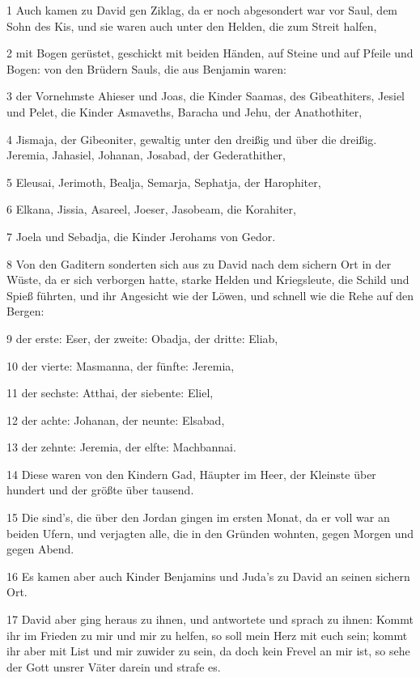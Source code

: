 \par 1 Auch kamen zu David gen Ziklag, da er noch abgesondert war vor Saul, dem Sohn des Kis, und sie waren auch unter den Helden, die zum Streit halfen,
\par 2 mit Bogen gerüstet, geschickt mit beiden Händen, auf Steine und auf Pfeile und Bogen: von den Brüdern Sauls, die aus Benjamin waren:
\par 3 der Vornehmste Ahieser und Joas, die Kinder Saamas, des Gibeathiters, Jesiel und Pelet, die Kinder Asmaveths, Baracha und Jehu, der Anathothiter,
\par 4 Jismaja, der Gibeoniter, gewaltig unter den dreißig und über die dreißig. Jeremia, Jahasiel, Johanan, Josabad, der Gederathither,
\par 5 Eleusai, Jerimoth, Bealja, Semarja, Sephatja, der Harophiter,
\par 6 Elkana, Jissia, Asareel, Joeser, Jasobeam, die Korahiter,
\par 7 Joela und Sebadja, die Kinder Jerohams von Gedor.
\par 8 Von den Gaditern sonderten sich aus zu David nach dem sichern Ort in der Wüste, da er sich verborgen hatte, starke Helden und Kriegsleute, die Schild und Spieß führten, und ihr Angesicht wie der Löwen, und schnell wie die Rehe auf den Bergen:
\par 9 der erste: Eser, der zweite: Obadja, der dritte: Eliab,
\par 10 der vierte: Masmanna, der fünfte: Jeremia,
\par 11 der sechste: Atthai, der siebente: Eliel,
\par 12 der achte: Johanan, der neunte: Elsabad,
\par 13 der zehnte: Jeremia, der elfte: Machbannai.
\par 14 Diese waren von den Kindern Gad, Häupter im Heer, der Kleinste über hundert und der größte über tausend.
\par 15 Die sind's, die über den Jordan gingen im ersten Monat, da er voll war an beiden Ufern, und verjagten alle, die in den Gründen wohnten, gegen Morgen und gegen Abend.
\par 16 Es kamen aber auch Kinder Benjamins und Juda's zu David an seinen sichern Ort.
\par 17 David aber ging heraus zu ihnen, und antwortete und sprach zu ihnen: Kommt ihr im Frieden zu mir und mir zu helfen, so soll mein Herz mit euch sein; kommt ihr aber mit List und mir zuwider zu sein, da doch kein Frevel an mir ist, so sehe der Gott unsrer Väter darein und strafe es.
